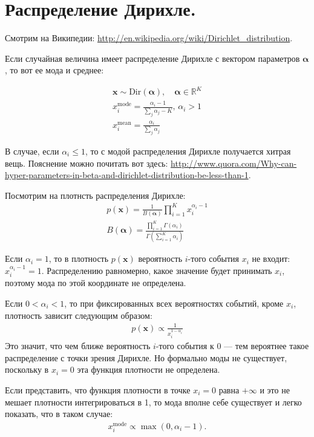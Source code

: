 \documentclass[]{article}
\renewcommand{\vec}[1]{{\boldsymbol #1}}
\begin{document}
\section{Распределение Дирихле.}
Смотрим на Википедии: \url{http://en.wikipedia.org/wiki/Dirichlet_distribution}.

Если случайная величина имеет распределение Дирихле с вектором параметров $\vec{\alpha}$, то вот ее мода и среднее:

\begin{gather}
\vec{x} \sim \text{Dir}(\vec{\alpha}), \quad \vec{\alpha} \in \mathbb{R}^K \\
x^\text{mode}_i = \frac{\alpha_i - 1}{\sum_{j} \alpha_j - K}, \, \alpha_i > 1 \\
x^\text{mean}_i = \frac{\alpha_i}{\sum_{j} \alpha_j}
\end{gather}

В случае, если $\alpha_i \leq 1$, то с модой распределения Дирихле получается хитрая вещь. Пояснение можно почитать вот здесь: \url{http://www.quora.com/Why-can-hyper-parameters-in-beta-and-dirichlet-distribution-be-less-than-1}.

Посмотрим на плотнсть распределения Дирихле:
\begin{gather}
	p(\vec{x}) = \frac{1}{B(\vec{\alpha})} \prod_{i=1}^K x_i^{\alpha_i-1} \\
	B(\vec{\alpha}) = \frac{\prod_{i=1}^K \Gamma(\alpha_i)}{\Gamma(\sum_{i=1}^K \alpha_i)}
\end{gather}

Если $\alpha_i = 1$, то в плотность $p(\vec{x})$ вероятность $i$-того события $x_i$ не входит: $x_i^{\alpha_i-1} = 1$. Распределению равномерно, какое значение будет принимать $x_i$, поэтому мода по этой координате не определена.

Если $0 < \alpha_i < 1$, то при фиксированных всех вероятностях событий, кроме $x_i$, плотность зависит следующим образом:
\begin{gather}
	p(\vec{x}) \propto \frac{1}{x_i^{1 - \alpha_i}}
\end{gather}
Это значит, что чем ближе вероятность $i$-того события к 0 — тем вероятнее такое распределение с точки зрения Дирихле. Но формально моды не существует, поскольку в $x_i = 0$ эта функция плотности не определена.

Если представить, что функция плотности в точке $x_i = 0$ равна $+\infty$ и это не мешает плотности интегрироваться в 1, то мода вполне себе существует и легко показать, что в таком случае:
\begin{gather}
x^\text{mode}_i \propto \max\left(0, \alpha_i - 1 \right).
\end{gather}
\end{document}
